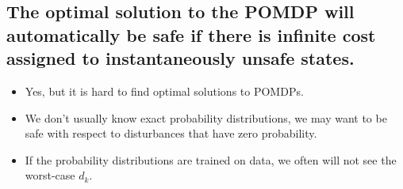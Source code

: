 \documentclass{article}
\begin{document}
\subsection{The optimal solution to the POMDP will automatically be safe if there is infinite cost assigned to instantaneously unsafe states.}

\begin{itemize}
    \item Yes, but it is hard to find optimal solutions to POMDPs.
    \item We don't usually know exact probability distributions, we may want to be safe with respect to disturbances that have zero probability.
    \item If the probability distributions are trained on data, we often will not see the worst-case $d_k$.
\end{itemize}
\end{document}
